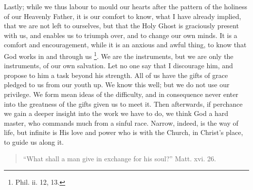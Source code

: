 Lastly; while we thus labour to mould our hearts after
the pattern of the holiness of our Heavenly Father, it is
our comfort to know, what I have already implied, that we
are not left to ourselves, but that the Holy Ghost is
graciously present with us, and enables us to triumph
over, and to change our own minds. It is a comfort and
encouragement, while it is an anxious and awful thing, to
know that God works in and through us \footnote{Phil. ii. 12,
13.}. We are the instruments, but we are only the
instruments, of our own salvation. Let no one say that I
discourage him, and propose to him a task beyond his
strength. All of us have the gifts of grace pledged to us
from our youth up. We know this well; but we do not use
our privilege. We form mean ideas of the difficulty, and
in consequence never enter into the greatness of the
gifts given us to meet it. Then afterwards, if perchance
we gain a deeper insight into the work we have to do, we
think God a hard master, who commands much from a sinful
race. Narrow, indeed, is the way of life, but infinite is
His love and power who is with the Church, in Christ's
place, to guide us along it.


\begin{quote}

``What shall a man give in exchange for his
soul?'' Matt. xvi. 26.

\end{quote}

